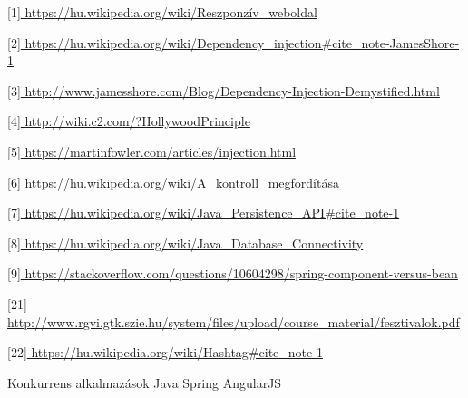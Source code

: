 \documentclass[11pt]{article}
\begin{document}
[1]\url{ https://hu.wikipedia.org/wiki/Reszponzív\_weboldal }

[2]\url{ https://hu.wikipedia.org/wiki/Dependency\_injection#cite_note-JamesShore-1 }	

[3]\url{ http://www.jamesshore.com/Blog/Dependency-Injection-Demystified.html }

[4]\url{ http://wiki.c2.com/?HollywoodPrinciple }

[5]\url{ https://martinfowler.com/articles/injection.html }

[6]\url{ https://hu.wikipedia.org/wiki/A_kontroll_megfordítása }

[7]\url{ https://hu.wikipedia.org/wiki/Java_Persistence_API#cite_note-1 }

[8]\url{ https://hu.wikipedia.org/wiki/Java_Database_Connectivity }

[9]\url{ https://stackoverflow.com/questions/10604298/spring-component-versus-bean }

[21]\url{ http://www.rgvi.gtk.szie.hu/system/files/upload/course_material/fesztivalok.pdf }

[22]\url{ https://hu.wikipedia.org/wiki/Hashtag#cite_note-1 }

Konkurrens alkalmazások
Java Spring
AngularJS
\end{document}
